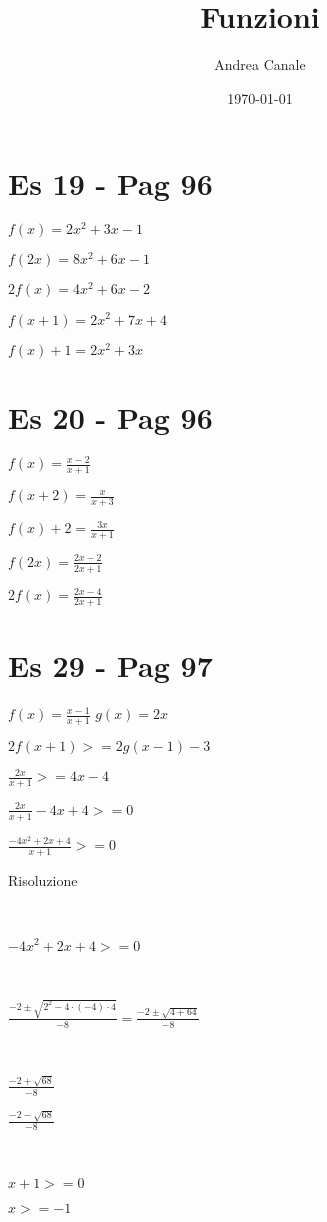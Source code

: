 \documentclass[12pt]{article}
\title{ Funzioni }
\author{ Andrea Canale }
\date{\today}
\begin{document}
\maketitle	

\section{Es 19 - Pag 96}


$  f(x) = 2x^2 + 3x - 1 $

$ f(2x) = 8x^2 + 6x - 1 $

$ 2f(x) = 4x^2 + 6x - 2 $

$ f(x + 1) = 2x^2 + 7x + 4 $

$ f(x) + 1 = 2x^2 + 3x $

\section{Es 20 - Pag 96}


$  f(x) = \frac{x-2}{x+1} $

$ f(x+2) = \frac{x}{x+3} $

$ f(x) + 2 = \frac{3x}{x+1} $

$ f(2x) = \frac{2x -2}{2x + 1} $

$ 2f(x) = \frac{2x-4}{2x + 1} $

\section{Es 29 - Pag 97}

$ f(x) = \frac{x-1}{x+1}$
$ g(x) = 2x $

$ 2f(x+1) >= 2g(x-1)-3 $

$ \frac{2x}{x+1} >= 4x -4 $

$ \frac{2x}{x+1} - 4x + 4 >= 0$

$ \frac{-4x^2+2x+4}{x+1} >= 0 $

Risoluzione

\,

$ -4x^2 + 2x + 4 >= 0 $

\,

$ \frac{-2 \pm \sqrt{2^2 - 4 \cdot (-4) \cdot 4}}{-8} = \frac{-2 \pm \sqrt{4 + 64}}{-8} $

\,

$ \frac{-2 + \sqrt{68}}{-8} $

$ \frac{-2 - \sqrt{68}}{-8} $

\,


$ x + 1 >= 0 $

$ x >= -1 $

\pagebreak
\end{document}
